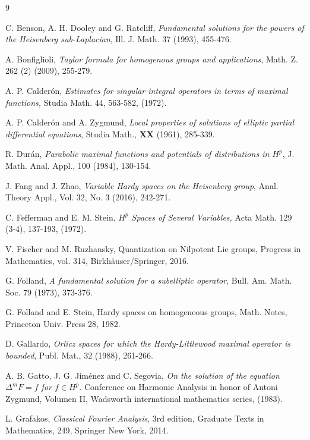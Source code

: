 \documentclass[oneside,10pt]{article}
\begin{document}
\begin{thebibliography}{9}

 C. Benson, A. H. Dooley and G. Ratcliff, \textit{Fundamental solutions for the powers of the Heisenberg 
sub-Laplacian}, Ill. J. Math. 37 (1993), 455-476.

 A. Bonfiglioli, \textit{Taylor formula for homogenous groups and applications}, Math. Z. 262 (2) (2009), 255-279.

 A. P. Calder\'on, \textit{Estimates for singular integral operators in terms of maximal functions,} Studia Math. 
44, 563-582, (1972).

 A. P. Calder\'on and A. Zygmund, \textit{Local properties of solutions of elliptic partial differential equations}, Studia Math., \textbf{XX} (1961), 285-339.

 R. Dur\'an, \textit{Parabolic maximal functions and potentials of distributions in $H^{p}$}, J. Math. Anal. Appl., 
100 (1984), 130-154.

 J. Fang and J. Zhao, \textit{Variable Hardy spaces on the Heisenberg group}, Anal. Theory Appl., Vol. 32, No. 3 (2016), 242-271.

 C. Fefferman and E. M. Stein, \textit{$H^{p}$ Spaces of Several Variables,} Acta Math. 129 (3-4), 137-193, (1972).

 V. Fischer and M. Ruzhansky, Quantization on Nilpotent Lie groups,  Progress in Mathematics, vol. 314, 
Birkh\"auser/Springer, 2016. 

 G. Folland, \textit{A fundamental solution for a subelliptic operator}, Bull. Am. Math. Soc. 79 (1973), 373-376.

 G. Folland and E. Stein, Hardy spaces on homogeneous groups, Math. Notes, Princeton Univ. Press 28, 1982.

 D. Gallardo, \textit{Orlicz spaces for which the Hardy-Littlewood maximal operator is bounded}, Publ. Mat., 32 (1988), 
261-266.

 A. B. Gatto, J. G. Jim\'enez and C. Segovia, \textit{On the solution of the equation $\Delta^{m}F = f$ for 
$f \in H^{p}$}. Conference on Harmonic Analysis in honor of Antoni Zygmund, Volumen II, Wadsworth international mathematics series, (1983).

 L. Grafakos, \textit{Classical Fourier Analysis}, 3rd edition, Graduate Texts in Mathematics, 249, Springer New York, 2014.


\end{thebibliography}
\end{document}
